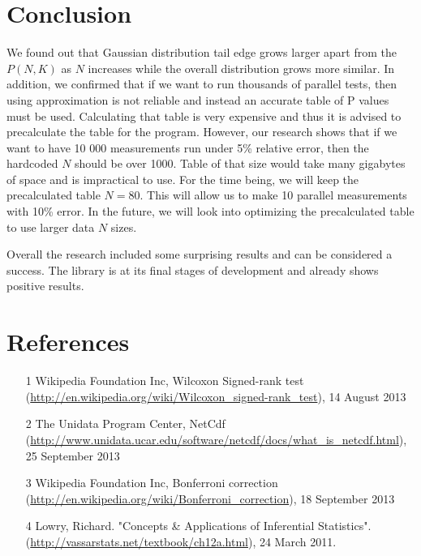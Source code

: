 \documentclass[12pt]{article}
\begin{document}
\section{Conclusion}
We found out that Gaussian distribution tail edge grows larger apart from the $P(N, K)$ as $N$ increases while the overall distribution grows more similar. In addition, we confirmed that if we want to run thousands of parallel tests, then using approximation is not reliable and instead an accurate table of P values must be used. Calculating that table is very expensive and thus it is advised to precalculate the table for the program. However, our research shows that if we want to have 10 000 measurements run under 5\% relative error, then the hardcoded $N$ should be over 1000. Table of that size would take many gigabytes of space and is impractical to use. For the time being, we will keep the precalculated table $N=80$. This will allow us to make 10 parallel measurements with 10\% error. In the future, we will look into optimizing the precalculated table to use larger data $N$ sizes.

Overall the research included some surprising results and can be considered a success. The library is at its final stages of development and already shows positive results.

\newpage

\section{References}
\begin{enumerate}
\item
[1] Wikipedia Foundation Inc, Wilcoxon Signed-rank test (\url{http://en.wikipedia.org/wiki/Wilcoxon_signed-rank_test}),  14 August 2013
\item
[2] The Unidata Program Center, NetCdf (\url{http://www.unidata.ucar.edu/software/netcdf/docs/what_is_netcdf.html}), 25 September 2013
\item
[3] Wikipedia Foundation Inc, Bonferroni correction (\url{http://en.wikipedia.org/wiki/Bonferroni_correction}), 18 September 2013
\item
[4]  Lowry, Richard. "Concepts \& Applications of Inferential Statistics". (\url{http://vassarstats.net/textbook/ch12a.html}), 24 March 2011.
\end{enumerate}
\end{document}
